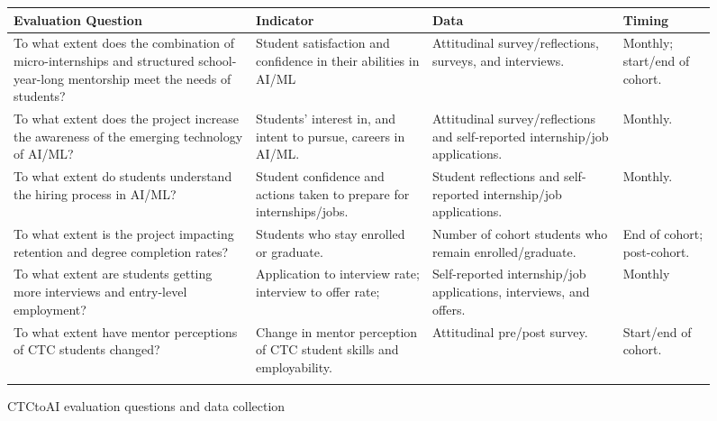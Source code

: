 \begin{figure}[H]
    \fontsize{11pt}{11pt}\selectfont
    \begin{tabularx}{\linewidth}{L{0.35} L{0.2} L{0.2} L{0.15}}
        \toprule
        \textbf{Evaluation Question} &
        \textbf{Indicator} &
        \textbf{Data} &
        \textbf{Timing} \\
        \midrule \endhead
        \bottomrule\endfoot
        
        To what extent does the combination of micro-internships and structured school-year-long mentorship meet the needs of students? &
        Student satisfaction and confidence in their abilities in AI/ML &
        Attitudinal survey/reflections, surveys, and interviews.  &
        Monthly; start/end of cohort. \\ \addlinespace \hline \addlinespace

        To what extent does the project increase the awareness of the emerging technology of AI/ML? &
        Students' interest in, and intent to pursue, careers in AI/ML. &
        Attitudinal survey/reflections and self-reported internship/job applications. &
        Monthly. \\ \addlinespace \hline \addlinespace

         
        To what extent do students understand the hiring process in AI/ML?  &
        Student confidence and actions taken to prepare for internships/jobs. &
        Student reflections and self-reported internship/job applications. &
        Monthly. \\ \addlinespace \hline \addlinespace

         
        To what extent is the project impacting retention and degree completion rates? &
        Students who stay enrolled or graduate. &
        Number of cohort students who remain enrolled/graduate. &
        End of cohort; post-cohort. \\ \addlinespace \hline \addlinespace

         
        To what extent are students getting more interviews and entry-level employment? &
        Application to interview rate; interview to offer rate; &
        Self-reported internship/job applications, interviews, and offers. &
        Monthly  \\ \addlinespace \hline \addlinespace

         
        To what extent have mentor perceptions of CTC students changed? &
        Change in mentor perception of CTC student skills and employability. &
        Attitudinal pre/post survey. &
        Start/end of cohort. \\ \addlinespace \hline \addlinespace
        
    \end{tabularx}
    \caption{CTCtoAI evaluation questions and data collection}
    \label{fig:dataCollection}
\end{figure}